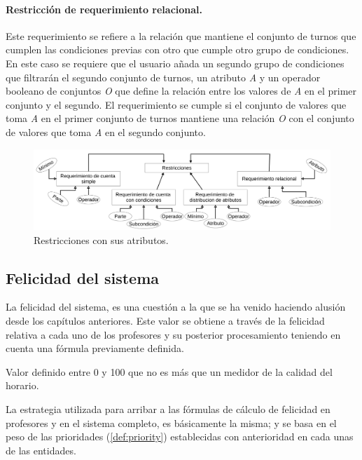 \paragraph{Restricción de requerimiento relacional.} Este requerimiento se refiere a la relación que mantiene el conjunto de turnos que cumplen las condiciones previas con otro que cumple otro grupo de condiciones. En este caso se requiere que el usuario añada un segundo grupo de condiciones que filtrarán el segundo conjunto de turnos, un atributo \textit{A} y un operador booleano de conjuntos \textit{O} que define la relación entre los valores de \textit{A}
en el primer conjunto y el segundo. El requerimiento se cumple si el conjunto de valores que toma \textit{A} en el primer conjunto de turnos mantiene una relación \textit{O} con el conjunto de valores que toma \textit{A} en el segundo conjunto.

\begin{figure}[h!]
	\centering
	\includegraphics[width=0.95\linewidth]{images/Chapter 2/restrictions}
	\caption{Restricciones con sus atributos.}
	\label{fig:restrictions}
\end{figure}


\subsection{Felicidad del sistema}

La felicidad del sistema, es una cuestión a la que se ha venido haciendo alusión desde los capítulos anteriores. Este valor se obtiene a través de la felicidad relativa a cada uno de los profesores y su posterior procesamiento teniendo en cuenta una fórmula previamente definida.

\begin{dfn} 
	Valor definido entre 0 y 100 que no es más que un medidor de la calidad del horario.
\end{dfn}

La estrategia utilizada para arribar a las fórmulas de cálculo de felicidad en profesores y en el sistema completo, es básicamente la misma; y se basa en el peso de las prioridades (\ref{def:priority}) establecidas con anterioridad en cada unas de las entidades.

